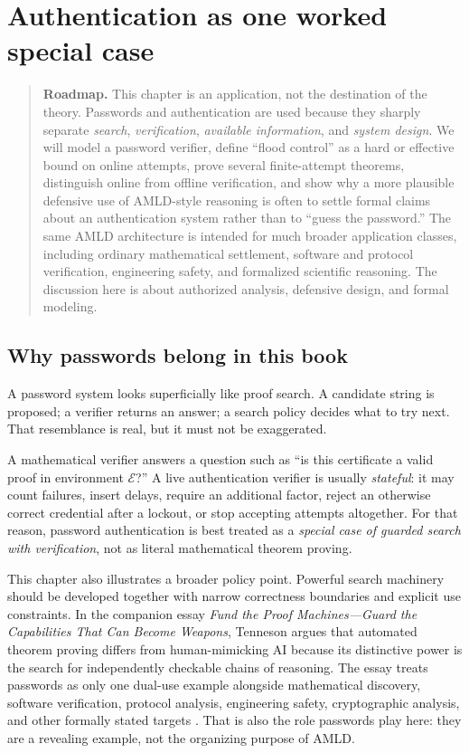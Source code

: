 \documentclass[11pt,openany]{book}
\theoremstyle{definition}
\theoremstyle{remark}
\newenvironment{roadmap}{\begin{quote}\small\color{deepblue}\textbf{Roadmap.} }{\end{quote}}
\newcommand{\Env}{\mathcal{E}}
\begin{document}
\chapter{Authentication as one worked special case}
\begin{roadmap}
This chapter is an application, not the destination of the theory. Passwords and authentication are used because they sharply separate \emph{search}, \emph{verification}, \emph{available information}, and \emph{system design}. We will model a password verifier, define ``flood control'' as a hard or effective bound on online attempts, prove several finite-attempt theorems, distinguish online from offline verification, and show why a more plausible defensive use of AMLD-style reasoning is often to settle formal claims about an authentication system rather than to ``guess the password.'' The same AMLD architecture is intended for much broader application classes, including ordinary mathematical settlement, software and protocol verification, engineering safety, and formalized scientific reasoning. The discussion here is about authorized analysis, defensive design, and formal modeling.
\end{roadmap}

\section{Why passwords belong in this book}
A password system looks superficially like proof search. A candidate string is proposed; a verifier returns an answer; a search policy decides what to try next. That resemblance is real, but it must not be exaggerated.

A mathematical verifier answers a question such as ``is this certificate a valid proof in environment $\Env$?'' A live authentication verifier is usually \emph{stateful}: it may count failures, insert delays, require an additional factor, reject an otherwise correct credential after a lockout, or stop accepting attempts altogether. For that reason, password authentication is best treated as a \emph{special case of guarded search with verification}, not as literal mathematical theorem proving.

This chapter also illustrates a broader policy point. Powerful search machinery should be developed together with narrow correctness boundaries and explicit use constraints. In the companion essay \emph{Fund the Proof Machines---Guard the Capabilities That Can Become Weapons}, Tenneson argues that automated theorem proving differs from human-mimicking AI because its distinctive power is the search for independently checkable chains of reasoning. The essay treats passwords as only one dual-use example alongside mathematical discovery, software verification, protocol analysis, engineering safety, cryptographic analysis, and other formally stated targets \cite{TennesonProofMachines2026}. That is also the role passwords play here: they are a revealing example, not the organizing purpose of AMLD.
\end{document}
